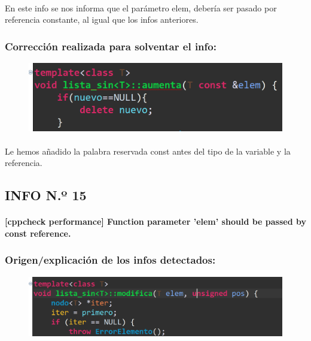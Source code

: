 			\paragraph{}En este info se nos informa que el parámetro elem, debería ser pasado por referencia constante, al igual que los infos anteriores.
			
		\subsubsection{Corrección realizada para solventar el info:}
		
			\begin{figure}[H]
				\centering
				\includegraphics[scale=0.55]{img/esteban21.png}
				\label{esteban21}
			\end{figure}
		
			\paragraph{}Le hemos añadido la palabra reservada const antes del tipo de la variable y la referencia.
			
	\subsection{INFO N.º 15}
	
		\paragraph{[cppcheck performance] Function parameter 'elem' should be passed by const reference.}
	
		\subsubsection{Origen/explicación de los infos detectados:}
		
			\begin{figure}[H]
				\centering
				\includegraphics[scale=0.55]{img/esteban22.png}
				\label{esteban22}
			\end{figure}
			
